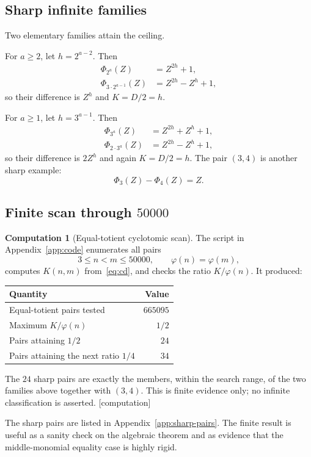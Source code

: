 \documentclass[11pt,oneside]{article}
\theoremstyle{definition}
\newtheorem{experiment}[theorem]{Computation}
\theoremstyle{remark}
\newcommand{\computed}{\textcolor{deepviolet}{\textsf{[computation]}}}
\begin{document}
\subsection{Sharp infinite families}

Two elementary families attain the ceiling.

For $a\ge2$, let $h=2^{a-2}$.  Then
\begin{align}
 \Phi_{2^a}(Z)&=Z^{2h}+1,\\
 \Phi_{3\cdot2^{a-1}}(Z)&=Z^{2h}-Z^h+1,
\end{align}
so their difference is $Z^h$ and $K=D/2=h$.

For $a\ge1$, let $h=3^{a-1}$.  Then
\begin{align}
 \Phi_{3^a}(Z)&=Z^{2h}+Z^h+1,\\
 \Phi_{2\cdot3^a}(Z)&=Z^{2h}-Z^h+1,
\end{align}
so their difference is $2Z^h$ and again $K=D/2=h$.  The pair $(3,4)$ is another sharp
example:
\[
 \Phi_3(Z)-\Phi_4(Z)=Z.
\]

\subsection{Finite scan through \texorpdfstring{$50000$}{50000}}

\begin{experiment}[Equal-totient cyclotomic scan]
\label{exp:scan}
The script in Appendix~\ref{app:code} enumerates all pairs
\[
 3\le n<m\le50000,\qquad \varphi(n)=\varphi(m),
\]
computes $K(n,m)$ from~\eqref{eq:cd}, and checks the ratio $K/\varphi(n)$.
It produced:
\begin{center}
\begin{tabular}{lr}
\toprule
Quantity & Value\\
\midrule
Equal-totient pairs tested & $665095$\\
Maximum $K/\varphi(n)$ & $1/2$\\
Pairs attaining $1/2$ & $24$\\
Pairs attaining the next ratio $1/4$ & $34$\\
\bottomrule
\end{tabular}
\end{center}
The $24$ sharp pairs are exactly the members, within the search range, of the two families
above together with $(3,4)$.  This is finite evidence only; no infinite classification is
asserted.  \computed
\end{experiment}

The sharp pairs are listed in Appendix~\ref{app:sharp-pairs}.  The finite result is useful as
a sanity check on the algebraic theorem and as evidence that the middle-monomial equality
case is highly rigid.
\end{document}
